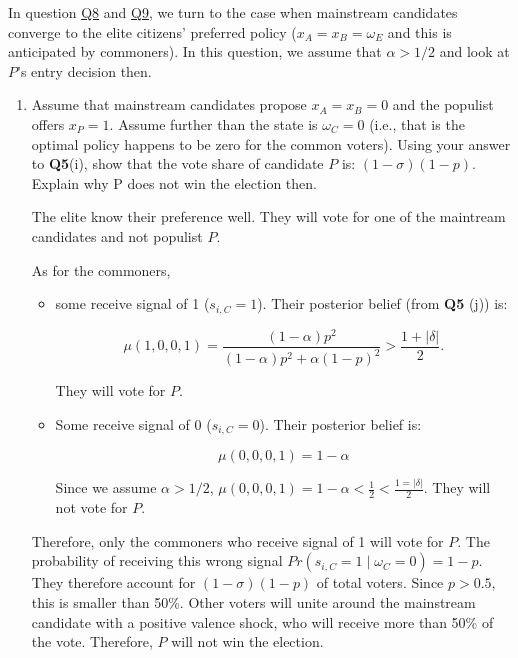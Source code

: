 \documentclass[
  letterpaper,
  abstract=true]{scrartcl}
\begin{document}
In question \protect\hyperlink{q8}{Q8} and \protect\hyperlink{q9}{Q9},
we turn to the case when mainstream candidates converge to the elite
citizens' preferred policy (\(x_A = x_B = \omega_E\) and this is
anticipated by commoners). In this question, we assume that
\(\alpha > 1/2\) and look at \(P\)'s entry decision then.

\begin{enumerate}
\def\labelenumi{(\alph{enumi})}
\item
  Assume that mainstream candidates propose \(x_A=x_B=0\) and the
  populist offers \(x_P =1\). Assume further than the state is
  \(\omega_C = 0\) (i.e., that is the optimal policy happens to be zero
  for the common voters). Using your answer to \textbf{Q5}(i), show that
  the vote share of candidate \(P\) is: \((1 − \sigma)(1 − p)\). Explain
  why P does not win the election then.

  \color{blue}

  The elite know their preference well. They will vote for one of the
  maintream candidates and not populist \(P\).

  As for the commoners,

  \begin{itemize}
  \item
    some receive signal of 1 (\(s_{i,C}=1\)). Their posterior belief
    (from \textbf{Q5} (j)) is:

    \[
    \mu(1,0,0,1)=\frac{(1-\alpha)p^2}{(1-\alpha)p^2+\alpha(1-p)^2}>\frac{1+|\delta|}{2}.
    \]

    They will vote for \(P\).
  \item
    Some receive signal of 0 (\(s_{i,C}=0\)). Their posterior belief is:

    \[
    \mu(0,0,0,1)=1-\alpha
    \]

    Since we assume \(\alpha>1/2\),
    \(\mu(0,0,0,1)=1-\alpha<\frac{1}{2}<\frac{1=|\delta|}{2}\). They
    will not vote for \(P\).
  \end{itemize}

  Therefore, only the commoners who receive signal of 1 will vote for
  \(P\). The probability of receiving this wrong signal
  \(Pr(s_{i,C}=1\mid \omega_C=0)=1-p\). They therefore account for
  \((1-\sigma)(1-p)\) of total voters. Since \(p>0.5\), this is smaller
  than 50\%. Other voters will unite around the mainstream candidate
  with a positive valence shock, who will receive more than 50\% of the
  vote. Therefore, \(P\) will not win the election.


\end{enumerate}
\end{document}
